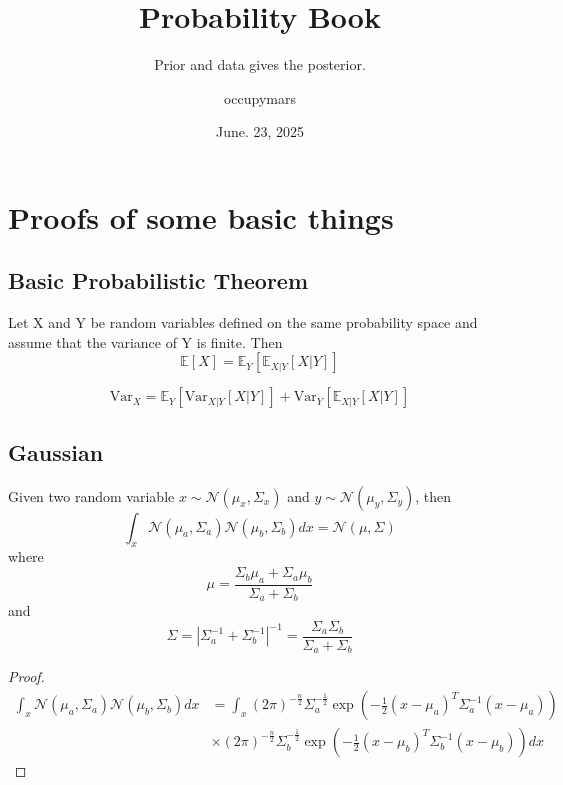 \documentclass[10pt]{elegantbook}
\title{Probability Book}
\subtitle{Prior and data gives the posterior.}
\author{occupymars}
\date{June. 23, 2025}
\begin{document}
\maketitle

\frontmatter
\tableofcontents

\mainmatter

\chapter{Proofs of some basic things}

\section{Basic Probabilistic Theorem}

\begin{theorem}
    Let X and Y be random variables defined on the same probability space and assume that the variance of Y is finite. 
    Then
    \begin{equation}
        \mathbb E[X] = \mathbb E_Y \left [ \mathbb E_{X | Y} [X | Y] \right ]
    \end{equation}

    \begin{equation}
        \mathrm{Var}_X = \mathbb E_Y \left [ \mathrm{Var}_{X | Y} [X | Y] \right ] + \mathrm{Var}_Y \left [ \mathbb E_{X | Y} [X | Y] \right ]
    \end{equation}
\end{theorem}

\section{Gaussian}

\begin{theorem}
    Given two random variable $x \sim \mathcal N(\mu_x, \Sigma_x)$ and $y \sim \mathcal N(\mu_y, \Sigma_y)$, then
    \[
        \int_x \mathcal N(\mu_a, \Sigma_a) \mathcal N(\mu_b, \Sigma_b) dx = \mathcal N(\mu, \Sigma)
    \]
    where
    \[
        \mu = \frac{\Sigma_b \mu_a + \Sigma_a \mu_b}{\Sigma_a + \Sigma_b}
    \]
    and
    \[
        \Sigma = |\Sigma_a^{-1} + \Sigma_b^{-1}|^{-1} = \frac{\Sigma_a \Sigma_b}{\Sigma_a + \Sigma_b}
    \]
\end{theorem}

\begin{proof}
    \[
        \begin{aligned}
            \int_x \mathcal N(\mu_a, \Sigma_a) \mathcal N(\mu_b, \Sigma_b) dx
            &= \int_x (2 \pi)^{-\frac{n}{2}} \Sigma_a^{-\frac{1}{2}} \exp \left ( -\frac{1}{2} (x - \mu_a)^T \Sigma_a^{-1} (x - \mu_a) \right ) \\
            &\times (2 \pi)^{-\frac{n}{2}} \Sigma_b^{-\frac{1}{2}} \exp \left ( -\frac{1}{2} (x - \mu_b)^T \Sigma_b^{-1} (x - \mu_b) \right ) dx
        \end{aligned}
    \]    
\end{proof}
\end{document}
